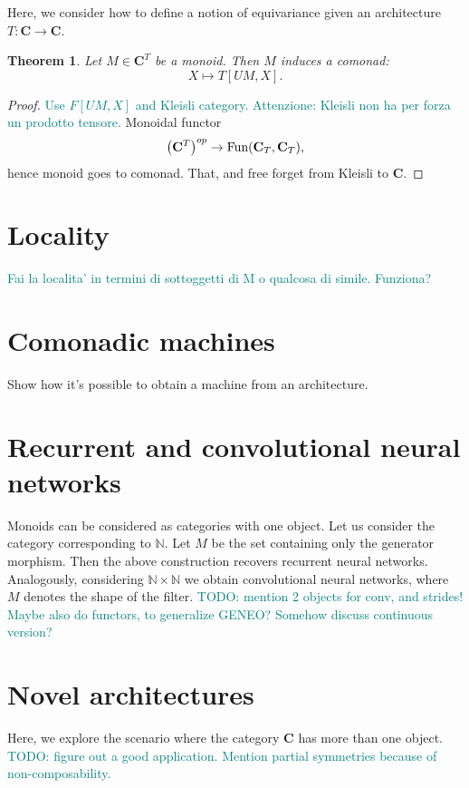 \documentclass[12pt]{article}
\newtheorem{theorem}{Theorem}
\newcommand{\pietro}[1]{\textcolor{teal}{#1}}
\newcommand{\Fun}{{\textnormal{Fun}}}
\newcommand{\Cat}{{\mathbf{C}}}
\begin{document}
Here, we consider how to define a notion of equivariance given an architecture $T\colon\Cat \rightarrow \Cat$.

\begin{theorem}\label{thm:weight_sharing}
    Let $M \in \Cat^T$ be a monoid. Then $M$ induces a comonad:
    \begin{equation*}
        X \mapsto T[UM, X].
    \end{equation*}
\end{theorem}

\begin{proof}
    \pietro{Use $F[UM, X]$ and Kleisli category. Attenzione: Kleisli non ha per forza un prodotto tensore.} Monoidal functor
    \begin{equation*}
        \left(\Cat^T\right)^{op} \rightarrow \Fun(\Cat_T, \Cat_T),
    \end{equation*}
    hence monoid goes to comonad. That, and free forget from Kleisli to $\Cat$.
\end{proof}

\section{Locality}

\pietro{Fai la localita' in termini di sottoggetti di M o qualcosa di simile. Funziona?}

\section{Comonadic machines}

Show how it's possible to obtain a machine from an architecture.

\section{Recurrent and convolutional neural networks}

Monoids can be considered as categories with one object. Let us consider the category corresponding to $\mathbb N$. Let $M$ be the set containing only the generator morphism. Then the above construction recovers recurrent neural networks. Analogously, considering $\mathbb N \times \mathbb N$ we obtain convolutional neural networks, where $M$ denotes the shape of the filter.
\pietro{TODO: mention 2 objects for conv, and strides!}
\pietro{Maybe also do functors, to generalize GENEO? Somehow discuss continuous version?}

\section{Novel architectures}

Here, we explore the scenario where the category $\Cat$ has more than one object.
\pietro{TODO: figure out a good application.}
\pietro{Mention partial symmetries because of non-composability.}



\end{document}
